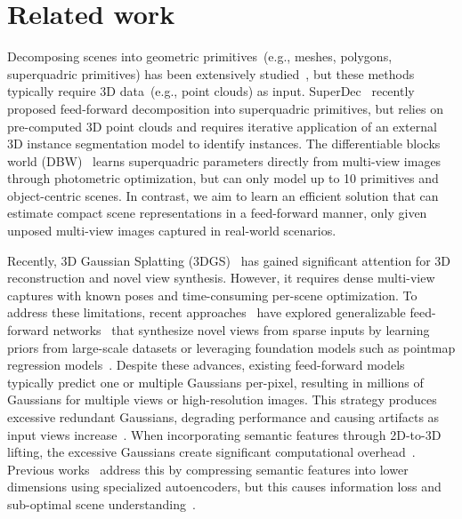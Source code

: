 \section{Related work}
\label{sec:relwork}

Decomposing scenes into geometric primitives~(e.g., meshes, polygons, superquadric primitives) has been extensively studied~\cite{tulsiani2017learning, paschalidou2019superquadrics, paschalidou2020learning}, but these methods typically require 3D data~(e.g., point clouds) as input. SuperDec~\cite{fedele2025superdec} recently proposed feed-forward decomposition into superquadric primitives, but relies on pre-computed 3D point clouds and requires iterative application of an external 3D instance segmentation model to identify instances. The differentiable blocks world (DBW)~\cite{monnier2023differentiable} learns superquadric parameters directly from multi-view images through photometric optimization, but can only model up to 10 primitives and object-centric scenes. In contrast, we aim to learn an efficient solution that can estimate compact scene representations in a feed-forward manner, only given unposed multi-view images captured in real-world scenarios. 

Recently, 3D Gaussian Splatting (3DGS)~\cite{kerbl20233d} has gained significant attention for 3D reconstruction and novel view synthesis. However, it requires dense multi-view captures with known poses and time-consuming per-scene optimization. To address these limitations, recent approaches~\cite{charatan2024pixelsplat, chen2024mvsplat, du2023learning, johari2022geonerf, wang2021ibrnet, xu2024murf, yu2021pixelnerf, zhang2025transplat} have explored generalizable feed-forward networks~\cite{ye2024no, hong2024unifying, huang2025no, hong2024pf3plat, jiang2025anysplat, smart2024splatt3r} that synthesize novel views from sparse inputs by learning priors from large-scale datasets or leveraging foundation models such as pointmap regression models~\cite{wang2024dust3r, leroy2024grounding, wang2025vggt}. Despite these advances, existing feed-forward models~\cite{ye2024no, huang2025no} typically predict one or multiple Gaussians per-pixel, resulting in millions of Gaussians for multiple views or high-resolution images. This strategy produces excessive redundant Gaussians, degrading performance and causing artifacts as input views increase~\cite{wang2024freesplat, wang2025volsplat}. When incorporating semantic features through 2D-to-3D lifting, the excessive Gaussians create significant computational overhead~\cite{lee2025cf3, burgess2006spatial}. Previous works~\cite{zhou2024feature, fan2024large, burgess2006spatial, qin2024langsplat} address this by compressing semantic features into lower dimensions using specialized autoencoders, but this causes information loss and sub-optimal scene understanding~\cite{li2025langsplatv2}.


